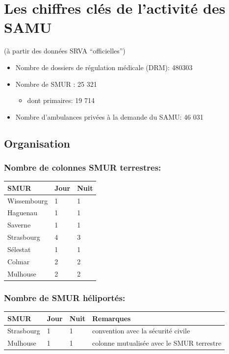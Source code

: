 \documentclass[]{article}
\begin{document}
\section{Les chiffres clés de l'activité des
SAMU}\label{les-chiffres-cles-de-lactivite-des-samu}

(à partir des données SRVA ``officielles'')

\begin{itemize}
\itemsep1pt\parskip0pt
\item
  Nombre de dossiers de régulation médicale (DRM): 480303
\item
  Nombre de SMUR : 25 321

  \begin{itemize}
  \itemsep1pt\parskip0pt
  \item
    dont primaires: 19 714
  \end{itemize}
\item
  Nombre d'ambulances privées à la demande du SAMU: 46 031
\end{itemize}

\subsection{Organisation}\label{organisation}

\subsubsection{Nombre de colonnes SMUR
terrestres:}\label{nombre-de-colonnes-smur-terrestres}

\begin{longtable}[c]{@{}lll@{}}
\toprule
SMUR & Jour & Nuit\tabularnewline
\midrule
\endhead
Wissembourg & 1 & 1\tabularnewline
Haguenau & 1 & 1\tabularnewline
Saverne & 1 & 1\tabularnewline
Strasbourg & 4 & 3\tabularnewline
Sélestat & 1 & 1\tabularnewline
Colmar & 2 & 2\tabularnewline
Mulhouse & 2 & 2\tabularnewline
\bottomrule
\end{longtable}

\subsubsection{Nombre de SMUR
héliportés:}\label{nombre-de-smur-heliportes}

\begin{longtable}[c]{@{}llll@{}}
\toprule
SMUR & Jour & Nuit & Remarques\tabularnewline
\midrule
\endhead
Strasbourg & 1 & 1 & convention avec la sécurité civile\tabularnewline
Mulhouse & 1 & 1 & colonne mutualisée avec le SMUR
terrestre\tabularnewline
\bottomrule
\end{longtable}
\end{document}
